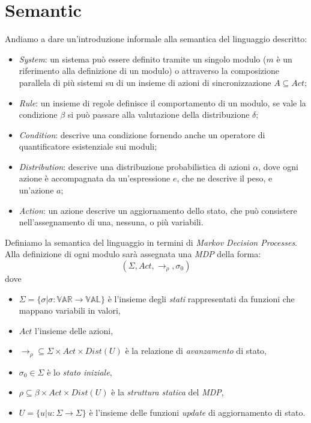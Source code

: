 \documentclass{article}
\begin{document}
\section{Semantic}
Andiamo a dare un'introduzione informale alla semantica del linguaggio descritto:
\begin{itemize}
	\item \emph{System}: un sistema può essere definito tramite un singolo modulo ($m$ è un riferimento alla definizione di un modulo) o attraverso la composizione parallela di più sistemi su di un insieme di azioni di sincronizzazione $A \subseteq Act$;
	\item \emph{Rule}: un insieme di regole definisce il comportamento di un modulo, se vale la condizione $\beta$ si può passare alla valutazione della distribuzione $\delta$;
	\item \emph{Condition}: descrive una condizione fornendo anche un operatore di quantificatore esistenziale sui moduli;
	\item \emph{Distribution}: descrive una distribuzione probabilistica di azioni $\alpha$, dove ogni azione è accompagnata da un'espressione $e$, che ne descrive il peso, e un'azione $a$;
	\item \emph{Action}: un azione descrive un aggiornamento dello stato, che può consistere nell'assegnamento di una, nessuna, o più variabili.
\end{itemize}

Definiamo la semantica del linguaggio in termini di \emph{Markov Decision Processes}. Alla definizione di ogni modulo sarà assegnata una \emph{MDP} della forma:
$$ (\Sigma,Act,\rightarrow_\rho,\sigma_0) $$
dove 
\begin{itemize}
	\item $\Sigma = \{\sigma | \sigma : \mathbb{VAR} \rightarrow \mathbb{VAL}\}$ è l'insieme degli \emph{stati} rappresentati da funzioni che mappano variabili in valori,
	\item $Act$ l'insieme delle azioni,
	\item $\rightarrow_\rho \subseteq \Sigma \times Act \times Dist(U)$ è la relazione di \emph{avanzamento} di stato,
	\item $\sigma_0 \in \Sigma$ è lo \emph{stato iniziale},
	\item $\rho \subseteq \beta \times Act \times Dist(U)$ è la \emph{struttura statica} del \emph{MDP},
	\item $U = \{u | u : \Sigma \rightarrow \Sigma \}$ è l'insieme delle funzioni \emph{update} di aggiornamento di stato.
\end{itemize}
\end{document}
